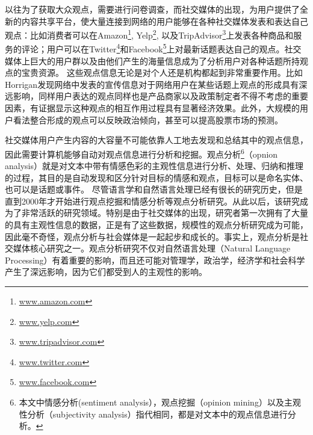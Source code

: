 以往为了获取大众观点，需要进行问卷调查，而社交媒体的出现，为用户提供了全新的内容共享平台，使大量连接到网络的用户能够在各种社交媒体发表和表达自己观点：比如消费者可以在Amazon\footnote{\url{www.amazon.com}}, Yelp\footnote{\url{www.yelp.com}}, 以及TripAdvisor\footnote{\url{www.tripadvisor.com}}上发表各种商品和服务的评论；用户可以在Twitter\footnote{\url{www.twitter.com}}和Facebook\footnote{\url{www.facebook.com}}上对最新话题表达自己的观点。社交媒体上巨大的用户群以及由他们产生的海量信息成为了分析用户对各种话题所持观点的宝贵资源。
这些观点信息无论是对个人还是机构都起到非常重要作用。比如Horrigan发现网络中发表的宣传信息对于网络用户在某些话题上观点的形成具有深远影响，同样用户表达的观点同样也是产品商家以及政策制定者不得不考虑的重要因素，有证据显示这种观点的相互作用过程具有显著经济效果。此外，大规模的用户看法整合形成的观点可以反映政治倾向，甚至可以提高股票市场的预测。

社交媒体用户产生内容的大容量不可能依靠人工地去发现和总结其中的观点信息，因此需要计算机能够自动对观点信息进行分析和挖掘。观点分析\footnote{本文中情感分析(sentiment analysis），观点挖掘（opinion mining）以及主观性分析（subjectivity analysis）指代相同，都是对文本中的观点信息进行分析。}（opnion analysis）就是对文本中带有情感色彩的主观性信息进行分析、处理、归纳和推理的过程，其目的是自动发现和区分针对目标的情感和观点，目标可以是命名实体、也可以是话题或事件。
尽管语言学和自然语言处理已经有很长的研究历史，但是直到2000年才开始进行观点挖掘和情感分析等观点分析研究。从此以后，该研究成为了非常活跃的研究领域。特别是由于社交媒体的出现，研究者第一次拥有了大量的具有主观性信息的数据，正是有了这些数据，规模性的观点分析研究成为可能，因此毫不奇怪，观点分析与社会媒体是一起起步和成长的。事实上，观点分析是社交媒体核心研究之一。观点分析研究不仅对自然语言处理（Natural Language Processing）有着重要的影响，而且还可能对管理学，政治学，经济学和社会科学产生了深远影响，因为它们都受到人的主观性的影响。

%
%

